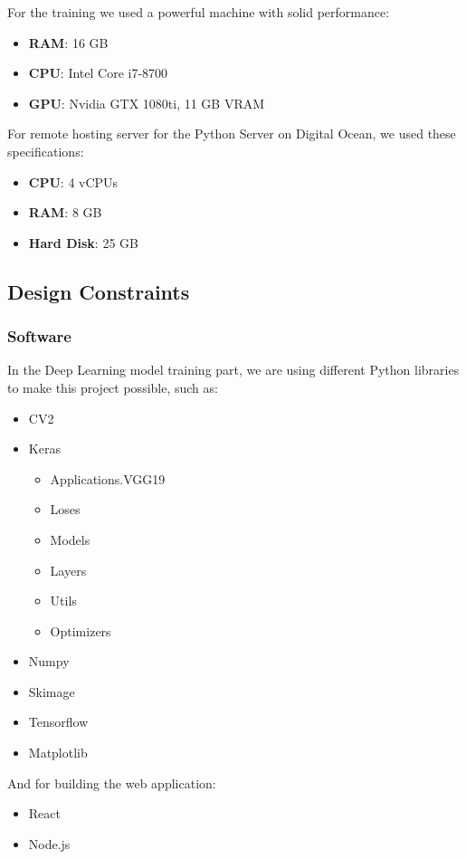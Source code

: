\documentclass[12pt]{article}
\begin{document}
				For the training we used a powerful machine with solid performance:
				\begin{itemize}
					\item \textbf{RAM}: 16 GB
					\item \textbf{CPU}: Intel Core i7-8700
					\item \textbf{GPU}: Nvidia GTX 1080ti, 11 GB VRAM
				\end{itemize}
				
				For remote hosting server for the Python Server on Digital Ocean, we used these specifications:
				\begin{itemize}
					\item \textbf{CPU}: 4 vCPUs
					\item \textbf{RAM}: 8 GB
					\item \textbf{Hard Disk}: 25 GB
				\end{itemize}
		\subsection{Design Constraints}
			\subsubsection{Software}
				In the Deep Learning model training part, we are using different Python libraries to make this project possible, such as:
				\begin{itemize}
					\item CV2
					\item Keras
						\begin{itemize}
							\item Applications.VGG19
							\item Loses
							\item Models
							\item Layers
							\item Utils
							\item Optimizers
						\end{itemize}
					\item Numpy
					\item Skimage
					\item Tensorflow
					\item Matplotlib 
				\end{itemize}
				And for building the web application:
				\begin{itemize}
					\item React
					\item Node.js
				\end{itemize}
\end{document}
